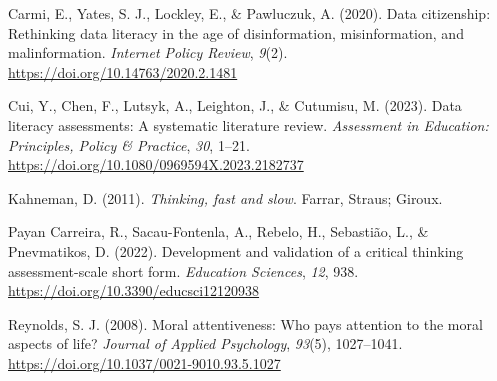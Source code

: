 \documentclass[
  12pt,
  a4paper,
  twoside]{article}
\newlength{\cslhangindent}
\newlength{\cslentryspacingunit} %
\newenvironment{CSLReferences}[2] %
 {%
  \setlength{\parindent}{0pt}
  \ifodd #1
  \let\oldpar\par
  \def\par{\hangindent=\cslhangindent\oldpar}
  \fi
  \setlength{\parskip}{#2\cslentryspacingunit}
 }%
 {}
\begin{document}
\hypertarget{refs}{}
\begin{CSLReferences}{1}{0}
\leavevmode{}%
Carmi, E., Yates, S. J., Lockley, E., \& Pawluczuk, A. (2020). Data citizenship: Rethinking data literacy in the age of disinformation, misinformation, and malinformation. \emph{Internet Policy Review}, \emph{9}(2). \url{https://doi.org/10.14763/2020.2.1481}

\leavevmode{}%
Cui, Y., Chen, F., Lutsyk, A., Leighton, J., \& Cutumisu, M. (2023). Data literacy assessments: A systematic literature review. \emph{Assessment in Education: Principles, Policy \& Practice}, \emph{30}, 1--21. \url{https://doi.org/10.1080/0969594X.2023.2182737}

\leavevmode{}%
Kahneman, D. (2011). \emph{Thinking, fast and slow}. Farrar, Straus; Giroux.

\leavevmode{}%
Payan Carreira, R., Sacau-Fontenla, A., Rebelo, H., Sebastião, L., \& Pnevmatikos, D. (2022). Development and validation of a critical thinking assessment-scale short form. \emph{Education Sciences}, \emph{12}, 938. \url{https://doi.org/10.3390/educsci12120938}

\leavevmode{}%
Reynolds, S. J. (2008). Moral attentiveness: Who pays attention to the moral aspects of life? \emph{Journal of Applied Psychology}, \emph{93}(5), 1027--1041. \url{https://doi.org/10.1037/0021-9010.93.5.1027}

\end{CSLReferences}
\end{document}
